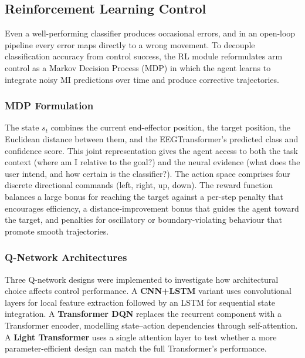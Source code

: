 \documentclass[12pt, a4paper]{article}
\begin{document}
\subsection{Reinforcement Learning Control}

Even a well-performing classifier produces occasional errors, and in an open-loop pipeline every error maps directly to a wrong movement. To decouple classification accuracy from control success, the RL module reformulates arm control as a Markov Decision Process (MDP) in which the agent learns to integrate noisy MI predictions over time and produce corrective trajectories.

\subsubsection{MDP Formulation}

The state $s_t$ combines the current end-effector position, the target position, the Euclidean distance between them, and the EEGTransformer's predicted class and confidence score. This joint representation gives the agent access to both the task context (where am I relative to the goal?) and the neural evidence (what does the user intend, and how certain is the classifier?). The action space comprises four discrete directional commands (left, right, up, down). The reward function balances a large bonus for reaching the target against a per-step penalty that encourages efficiency, a distance-improvement bonus that guides the agent toward the target, and penalties for oscillatory or boundary-violating behaviour that promote smooth trajectories.

\subsubsection{Q-Network Architectures}

Three Q-network designs were implemented to investigate how architectural choice affects control performance. A \textbf{CNN+LSTM} variant uses convolutional layers for local feature extraction followed by an LSTM for sequential state integration. A \textbf{Transformer DQN} replaces the recurrent component with a Transformer encoder, modelling state--action dependencies through self-attention. A \textbf{Light Transformer} uses a single attention layer to test whether a more parameter-efficient design can match the full Transformer's performance.
\end{document}
